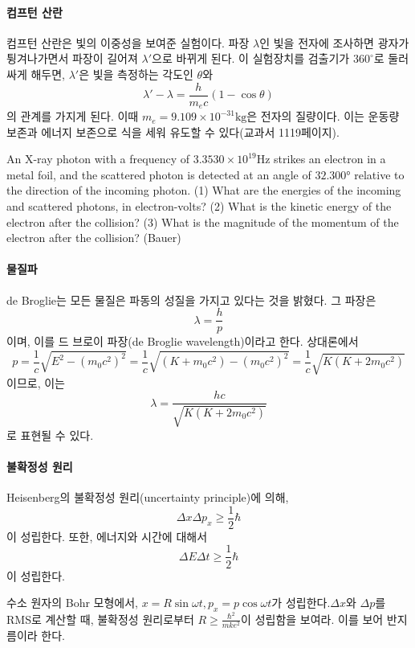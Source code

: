 \paragraph{컴프턴 산란}
컴프턴 산란은 빛의 이중성을 보여준 실험이다. 파장 $\lambda$인 빛을 전자에 조사하면 광자가 튕겨나가면서 파장이 길어져 $\lambda'$으로 바뀌게 된다. 이 실험장치를 검출기가 $360^\circ$로 둘러싸게 해두면, $\lambda'$은 빛을 측정하는 각도인 $\theta$와
\begin{equation}
\lambda'-\lambda = \frac{h}{m_ec}(1-\cos\theta)
\end{equation}
의 관계를 가지게 된다. 이때 $m_e=9.109\times10^{-31}\mathrm{kg}$은 전자의 질량이다. 이는 운동량 보존과 에너지 보존으로 식을 세워 유도할 수 있다(교과서 1119페이지).
\begin{exercise}
An X-ray photon with a frequency of $3.3530\times 10^{19}\mathrm{Hz}$ strikes an electron in a metal foil, and the scattered photon is detected at an angle of $32.300°$ relative to the direction of the incoming photon. (1) What are the energies of the incoming and scattered photons, in electron-volts? (2) What is the kinetic energy of the electron after the collision? (3) What is the magnitude of the momentum of the electron after the collision? (Bauer)
\end{exercise}
\paragraph{물질파}
de Broglie는 모든 물질은 파동의 성질을 가지고 있다는 것을 밝혔다. 그 파장은
\begin{equation}
\lambda=\frac{h}{p}
\end{equation}
이며, 이를 드 브로이 파장(de Broglie wavelength)이라고 한다. 상대론에서
\begin{equation}
p=\frac{1}{c}\sqrt{E^2-(m_0c^2)^2}=\frac{1}{c}\sqrt{(K+m_0c^2)-(m_0c^2)^2}=\frac{1}{c}\sqrt{K(K+2m_0c^2)}
\end{equation}
이므로, 이는
\begin{equation}
\lambda=\frac{hc}{\sqrt{K(K+2m_0c^2)}}
\end{equation}
로 표현될 수 있다.

\paragraph{불확정성 원리}
Heisenberg의 불확정성 원리(uncertainty principle)에 의해,
\begin{equation}
\Delta x \Delta p_x \ge \frac{1}{2}\hbar
\end{equation}
이 성립한다. 또한, 에너지와 시간에 대해서
\begin{equation}
\Delta E \Delta t \ge \frac{1}{2}\hbar
\end{equation}
이 성립한다.
\begin{exercise}[수소 원자]
수소 원자의 Bohr 모형에서, $x=R\sin\omega t, p_x=p\cos\omega t$가 성립한다.$\Delta x$와 $\Delta p$를 RMS로 계산할 때, 불확정성 원리로부터 $R\ge \frac{\hbar^2}{mke^2}$이 성립함을 보여라. 이를 보어 반지름이라 한다.
\end{exercise}

